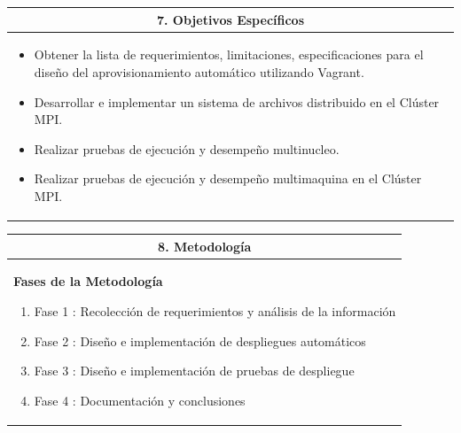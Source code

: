\documentclass[letter,12pt]{article}
\begin{document}

\begin{center}
\begin{tabular}{|p{15.5cm}|}
\hline
\multicolumn{1}{|c|}{ \textbf{7. Objetivos Específicos}}\\
\hline
\begin{itemize}
	\item Obtener la lista de requerimientos, limitaciones, especificaciones para el diseño del aprovisionamiento automático utilizando Vagrant.
	\item Desarrollar e implementar un sistema de archivos distribuido en el Clúster MPI.
    \item Realizar pruebas de ejecución y desempeño multinucleo.
    \item Realizar pruebas de ejecución y desempeño multimaquina en el Clúster MPI.
\end{itemize} \\
\hline
\end{tabular}
\end{center}


\begin{center}
\begin{tabular}{|p{15.5cm}|}
\hline
\multicolumn{1}{|c|}{ \textbf{8. Metodología} }\\
\hline
\textbf{Fases de la Metodología}
    \begin{enumerate}
        \item Fase 1 : Recolección de requerimientos y análisis de la información
        \item Fase 2 : Diseño e implementación de despliegues automáticos
        \item Fase 3 : Diseño e implementación de pruebas de despliegue
        \item Fase 4 : Documentación y conclusiones
        \end{enumerate}\\
\hline
\end{tabular}
\end{center}
\end{document}
